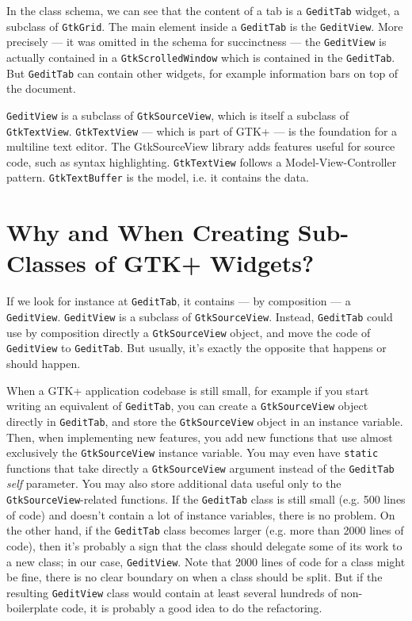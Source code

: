 In the class schema, we can see that the content of a tab is a \lstinline{GeditTab} widget, a subclass of \lstinline{GtkGrid}. The main element inside a \lstinline{GeditTab} is the \lstinline{GeditView}. More precisely --- it was omitted in the schema for succinctness --- the \lstinline{GeditView} is actually contained in a \lstinline{GtkScrolledWindow} which is contained in the \lstinline{GeditTab}. But \lstinline{GeditTab} can contain other widgets, for example information bars on top of the document.

\lstinline{GeditView} is a subclass of \lstinline{GtkSourceView}, which is itself a subclass of \lstinline{GtkTextView}. \lstinline{GtkTextView} --- which is part of GTK+ --- is the foundation for a multiline text editor. The GtkSourceView library adds features useful for source code, such as syntax highlighting. \lstinline{GtkTextView} follows a Model-View-Controller pattern. \lstinline{GtkTextBuffer} is the model, i.e. it contains the data.

\section{Why and When Creating Sub-Classes of GTK+ Widgets?}

If we look for instance at \lstinline{GeditTab}, it contains --- by composition --- a \lstinline{GeditView}. \lstinline{GeditView} is a subclass of \lstinline{GtkSourceView}. Instead, \lstinline{GeditTab} could use by composition directly a \lstinline{GtkSourceView} object, and move the code of \lstinline{GeditView} to \lstinline{GeditTab}. But usually, it's exactly the opposite that happens or should happen.

When a GTK+ application codebase is still small, for example if you start writing an equivalent of \lstinline{GeditTab}, you can create a \lstinline{GtkSourceView} object directly in \lstinline{GeditTab}, and store the \lstinline{GtkSourceView} object in an instance variable. Then, when implementing new features, you add new functions that use almost exclusively the \lstinline{GtkSourceView} instance variable. You may even have \lstinline{static} functions that take directly a \lstinline{GtkSourceView} argument instead of the \lstinline{GeditTab} \emph{self} parameter. You may also store additional data useful only to the \lstinline{GtkSourceView}-related functions. If the \lstinline{GeditTab} class is still small (e.g. 500 lines of code) and doesn't contain a lot of instance variables, there is no problem. On the other hand, if the \lstinline{GeditTab} class becomes larger (e.g. more than 2000 lines of code), then it's probably a sign that the class should delegate some of its work to a new class; in our case, \lstinline{GeditView}. Note that 2000 lines of code for a class might be fine, there is no clear boundary on when a class should be split. But if the resulting \lstinline{GeditView} class would contain at least several hundreds of non-boilerplate code, it is probably a good idea to do the refactoring.

